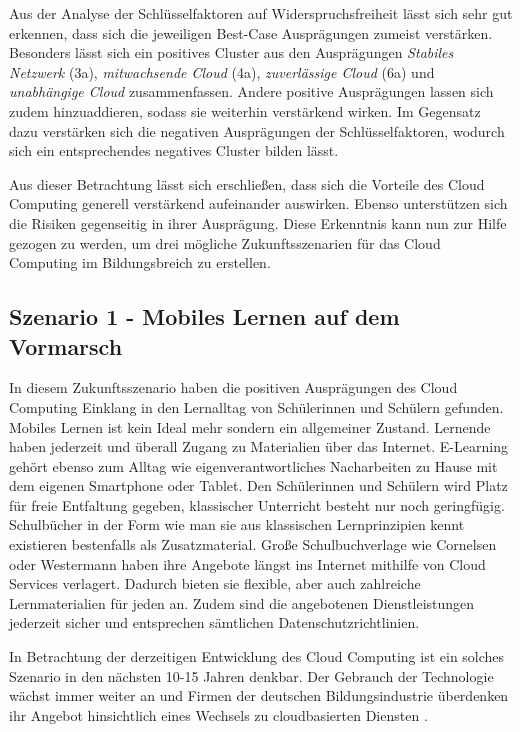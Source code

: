 Aus der Analyse der Schlüsselfaktoren auf Widerspruchsfreiheit lässt sich sehr gut erkennen, dass sich die jeweiligen Best-Case Ausprägungen zumeist verstärken. Besonders lässt sich ein positives Cluster aus den Ausprägungen \textit{Stabiles Netzwerk} (3a), \textit{mitwachsende Cloud} (4a), \textit{zuverlässige Cloud} (6a) und \textit{unabhängige Cloud} zusammenfassen. Andere positive Ausprägungen lassen sich zudem hinzuaddieren, sodass sie weiterhin verstärkend wirken. Im Gegensatz dazu verstärken sich die negativen Ausprägungen der Schlüsselfaktoren, wodurch sich ein entsprechendes negatives Cluster bilden lässt.

Aus dieser Betrachtung lässt sich erschließen, dass sich die Vorteile des Cloud Computing generell verstärkend aufeinander auswirken. Ebenso unterstützen sich die Risiken gegenseitig in ihrer Ausprägung. Diese Erkenntnis kann nun zur Hilfe gezogen zu werden, um drei mögliche Zukunftsszenarien für das Cloud Computing im Bildungsbreich zu erstellen.

\subsection{Szenario 1 - Mobiles Lernen auf dem Vormarsch}

In diesem Zukunftsszenario haben die positiven Ausprägungen des Cloud Computing Einklang in den Lernalltag von Schülerinnen und Schülern gefunden. Mobiles Lernen ist kein Ideal mehr sondern ein allgemeiner Zustand. Lernende haben jederzeit und überall Zugang zu Materialien über das Internet. E-Learning gehört ebenso zum Alltag wie eigenverantwortliches Nacharbeiten zu Hause mit dem eigenen Smartphone oder Tablet. Den Schülerinnen und Schülern wird Platz für freie Entfaltung gegeben, klassischer Unterricht besteht nur noch geringfügig. Schulbücher in der Form wie man sie aus klassischen Lernprinzipien kennt existieren bestenfalls als Zusatzmaterial. Große Schulbuchverlage wie Cornelsen oder Westermann haben ihre Angebote längst ins Internet mithilfe von Cloud Services verlagert. Dadurch bieten sie flexible, aber auch zahlreiche Lernmaterialien für jeden an. Zudem sind die angebotenen Dienstleistungen jederzeit sicher und entsprechen sämtlichen Datenschutzrichtlinien. 

In Betrachtung der derzeitigen Entwicklung des Cloud Computing ist ein solches Szenario in den nächsten 10-15 Jahren denkbar. Der Gebrauch der Technologie wächst immer weiter an \cite{krcmar} und Firmen der deutschen Bildungsindustrie überdenken ihr Angebot hinsichtlich eines Wechsels zu cloudbasierten Diensten \cite{grella}.

